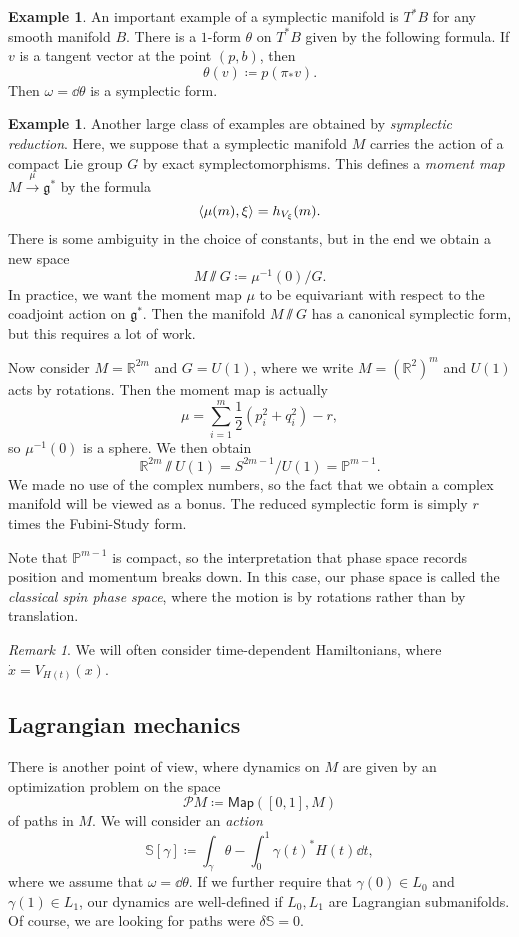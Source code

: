 \documentclass[leqno, openany]{memoir}
\theoremstyle{definition}
\newtheorem{exm}[thm]{Example}
\theoremstyle{remark}
\newtheorem{rmk}[thm]{Remark}
\theoremstyle{plain}
\theoremstyle{definition}
\theoremstyle{remark}
\newcommand{\R}{\mathbb{R}}
\renewcommand{\P}{\mathbb{P}}
\newcommand{\g}{\mathfrak{g}}
\newcommand{\mc}[1]{\mathcal{#1}}
\newcommand{\ms}[1]{\mathsf{#1}}
\begin{document}
\begin{exm}
  An important example of a symplectic manifold is $T^* B$ for any smooth manifold $B$. There is a $1$-form $\theta$ on $T^* B$ given by the following formula. If $v$ is a tangent vector at the point $(p,b)$, then
  \[ \theta(v) \coloneqq p(\pi_* v). \]
  Then $\omega = \dd{\theta}$ is a symplectic form.
\end{exm}

\begin{exm}
  Another large class of examples are obtained by \textit{symplectic reduction}. Here, we suppose that a symplectic manifold $M$ carries the action of a compact Lie group $G$ by exact symplectomorphisms. This defines a \textit{moment map} $M \xrightarrow{\mu} \g^*$ by the formula
  \[ \ev{\mu(m), \xi} = h_{V_{\xi}}(m). \]
  There is some ambiguity in the choice of constants, but in the end we obtain a new space
  \[ M \sslash G \coloneqq \mu^{-1}(0) / G. \]
  In practice, we want the moment map $\mu$ to be equivariant with respect to the coadjoint action on $\g^*$. Then the manifold $M \sslash G$ has a canonical symplectic form, but this requires a lot of work.

  Now consider $M = \R^{2m}$ and $G = U(1)$, where we write $M = (\R^2)^m$ and $U(1)$ acts by rotations. Then the moment map is actually
  \[ \mu = \sum_{i=1}^m \frac{1}{2} (p_i^2 + q_i^2) - r, \]
  so $\mu^{-1}(0)$ is a sphere. We then obtain
  \[ \R^{2m} \sslash U(1) = S^{2m-1}/U(1) = \P^{m-1}. \]
  We made no use of the complex numbers, so the fact that we obtain a complex manifold will be viewed as a bonus. The reduced symplectic form is simply $r$ times the Fubini-Study form.

  Note that $\P^{m-1}$ is compact, so the interpretation that phase space records position and momentum breaks down. In this case, our phase space is called the \textit{classical spin phase space}, where the motion is by rotations rather than by translation.
\end{exm}

\begin{rmk}
  We will often consider time-dependent Hamiltonians, where $\dot{x} = V_{H(t)}(x)$.
\end{rmk}

\subsection{Lagrangian mechanics}
\label{subsec:lagrangian}

There is another point of view, where dynamics on $M$ are given by an optimization problem on the space
\[ \mc{P}M \coloneqq \ms{Map}([0,1], M) \]
of paths in $M$. We will consider an \textit{action}
\[ \mathbb{S}[\gamma] \coloneqq \int_{\gamma} \theta - \int_0^1 \gamma(t)^* H(t) \dd{t}, \]
where we assume that $\omega = \dd{\theta}$. If we further require that $\gamma(0) \in L_0$ and $\gamma(1) \in L_1$, our dynamics are well-defined if $L_0, L_1$ are Lagrangian submanifolds. Of course, we are looking for paths were $\delta \mathbb{S} = 0$.
\end{document}
